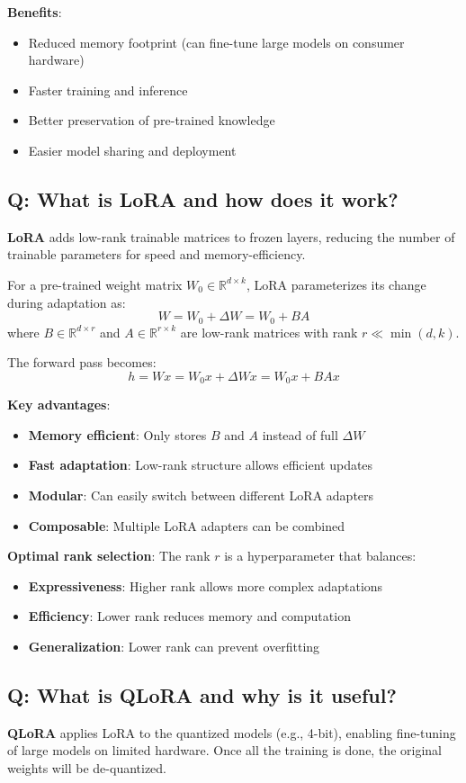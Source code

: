 \textbf{Benefits}:
\begin{itemize}
	\item Reduced memory footprint (can fine-tune large models on consumer hardware)
	\item Faster training and inference
	\item Better preservation of pre-trained knowledge
	\item Easier model sharing and deployment
\end{itemize}

\subsection*{Q: What is LoRA and how does it work?}
\textbf{LoRA} adds low-rank trainable matrices to frozen layers, reducing the number of trainable parameters for speed and memory-efficiency.

For a pre-trained weight matrix \(W_0 \in \mathbb{R}^{d \times k}\), LoRA parameterizes its change during adaptation as:
\[
W = W_0 + \Delta W = W_0 + BA
\]
where \(B \in \mathbb{R}^{d \times r}\) and \(A \in \mathbb{R}^{r \times k}\) are low-rank matrices with rank \(r \ll \min(d, k)\).

The forward pass becomes:
\[
h = Wx = W_0x + \Delta Wx = W_0x + BAx
\]

\textbf{Key advantages}:
\begin{itemize}
	\item \textbf{Memory efficient}: Only stores \(B\) and \(A\) instead of full \(\Delta W\)
	\item \textbf{Fast adaptation}: Low-rank structure allows efficient updates
	\item \textbf{Modular}: Can easily switch between different LoRA adapters
	\item \textbf{Composable}: Multiple LoRA adapters can be combined
\end{itemize}

\textbf{Optimal rank selection}:
The rank \(r\) is a hyperparameter that balances:
\begin{itemize}
	\item \textbf{Expressiveness}: Higher rank allows more complex adaptations
	\item \textbf{Efficiency}: Lower rank reduces memory and computation
	\item \textbf{Generalization}: Lower rank can prevent overfitting
\end{itemize}

\subsection*{Q: What is QLoRA and why is it useful?}
\textbf{QLoRA} applies LoRA to the quantized models (e.g., 4-bit), enabling fine-tuning of large models on limited hardware. Once all the training is done, the original weights will be de-quantized.

